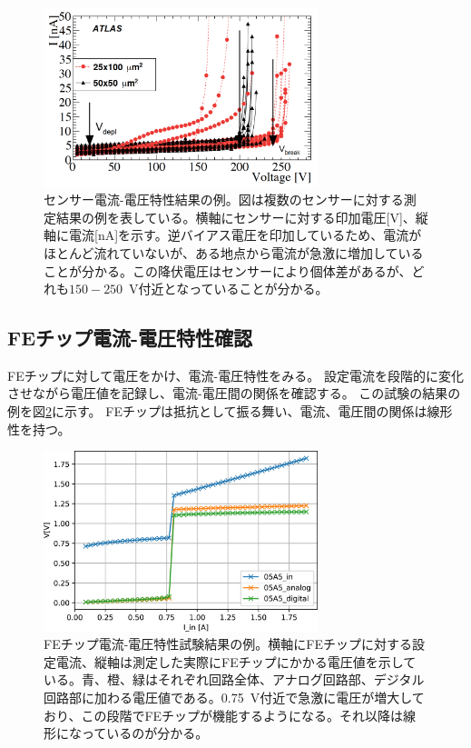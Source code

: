 \begin{figure}[bpt]\centering
\includegraphics[width=8cm]{./sensor_IV_result.png}
\caption[センサー電流-電圧特性結果の例]{センサー電流-電圧特性結果の例\cite{1-1}。図は複数のセンサーに対する測定結果の例を表している。横軸にセンサーに対する印加電圧[V]、縦軸に電流[nA]を示す。逆バイアス電圧を印加しているため、電流がほとんど流れていないが、ある地点から電流が急激に増加していることが分かる。この降伏電圧はセンサーにより個体差があるが、どれも$150-250$~V付近となっていることが分かる。}
\label{sensor_IV_result}
\end{figure}

\subsection{FEチップ電流-電圧特性確認}
FEチップに対して電圧をかけ、電流-電圧特性をみる。
設定電流を段階的に変化させながら電圧値を記録し、電流-電圧間の関係を確認する。
この試験の結果の例を図\ref{SLDO_VI_result}に示す。
FEチップは抵抗として振る舞い、電流、電圧間の関係は線形性を持つ。

\begin{figure}[bpt]\centering
\includegraphics[width=8cm]{./SLDO_VI_result.jpg}
\caption[FEチップ電流-電圧特性試験結果の例]{FEチップ電流-電圧特性試験結果の例\cite{3-7}。横軸にFEチップに対する設定電流、縦軸は測定した実際にFEチップにかかる電圧値を示している。青、橙、緑はそれぞれ回路全体、アナログ回路部、デジタル回路部に加わる電圧値である。0.75~V付近で急激に電圧が増大しており、この段階でFEチップが機能するようになる。それ以降は線形になっているのが分かる。}
\label{SLDO_VI_result}
\end{figure}

